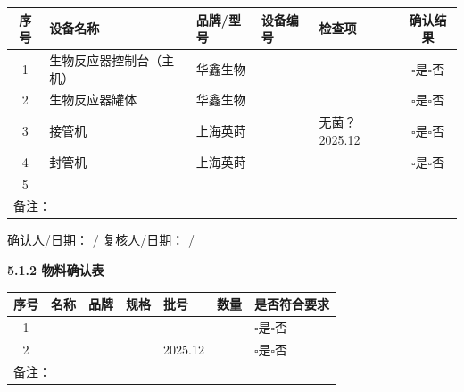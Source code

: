 \documentclass[UTF8,10pt,a4paper,fontset=fandol]{ctexart}
\newcommand{\fieldvalue}[1]{#1}
\newcommand{\handwritten}[1]{#1}
\begin{document}
\small
\begin{tabularx}{\textwidth}{|c|X|X|X|X|c|}
\hline
序号 & 设备名称 & 品牌/型号 & 设备编号 & 检查项 & 确认结果\\
\hline
1 &
\fieldvalue{生物反应器控制台（主机）} &
\fieldvalue{华鑫生物} &
 & & $\square$是\quad $\square$否\\
\hline
2 &
\fieldvalue{生物反应器罐体} &
\fieldvalue{华鑫生物} &
 & & $\square$是\quad $\square$否\\
\hline
3 &
\fieldvalue{接管机} &
\fieldvalue{上海英莳} &
 &
\fieldvalue{\handwritten{无菌？2025.12}} &
$\square$是\quad $\square$否\\
\hline
4 &
\fieldvalue{封管机} &
\fieldvalue{上海英莳} &
 & & $\square$是\quad $\square$否\\
\hline
5 & & & & & \\
\hline
\multicolumn{4}{|l|}{备注：} &
\multicolumn{2}{l|}{}\\
\hline
\end{tabularx}

\vspace{0.4em}

确认人/日期：
\fieldvalue{\handwritten{/}}
\hfill
复核人/日期：
\fieldvalue{\handwritten{/}}

\medskip
\textbf{5.1.2 物料确认表}

\begin{tabularx}{\textwidth}{|c|X|X|X|X|X|X|}
\hline
序号 & 名称 & 品牌 & 规格 & 批号 & 数量 & 是否符合要求\\
\hline
1 & & & & & & $\square$是\quad $\square$否\\
\hline
2 & & & & 
\fieldvalue{\handwritten{2025.12}} &
 & $\square$是\quad $\square$否\\
\hline
\multicolumn{6}{|l|}{备注：} &
\\
\hline
\end{tabularx}
\end{document}
